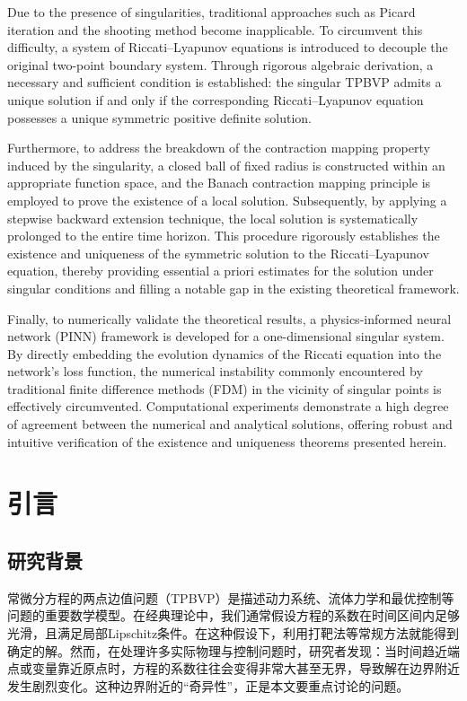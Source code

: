 \documentclass{GZUbachelorthesis}
\begin{document}
\begin{tocabstract}
\begin{enabstract}
  Due to the presence of singularities, traditional approaches such as Picard iteration and the shooting method become inapplicable. To circumvent this difficulty, a system of Riccati–Lyapunov equations is introduced to decouple the original two-point boundary system. Through rigorous algebraic derivation, a necessary and sufficient condition is established: the singular TPBVP admits a unique solution if and only if the corresponding Riccati–Lyapunov equation possesses a unique symmetric positive definite solution.
  
  Furthermore, to address the breakdown of the contraction mapping property induced by the singularity, a closed ball of fixed radius is constructed within an appropriate function space, and the Banach contraction mapping principle is employed to prove the existence of a local solution. Subsequently, by applying a stepwise backward extension technique, the local solution is systematically prolonged to the entire time horizon. This procedure rigorously establishes the existence and uniqueness of the symmetric solution to the Riccati–Lyapunov equation, thereby providing essential a priori estimates for the solution under singular conditions and filling a notable gap in the existing theoretical framework.
  
  Finally, to numerically validate the theoretical results, a physics-informed neural network (PINN) framework is developed for a one-dimensional singular system. By directly embedding the evolution dynamics of the Riccati equation into the network’s loss function, the numerical instability commonly encountered by traditional finite difference methods (FDM) in the vicinity of singular points is effectively circumvented. Computational experiments demonstrate a high degree of agreement between the numerical and analytical solutions, offering robust and intuitive verification of the existence and uniqueness theorems presented herein.
\end{enabstract}
\end{tocabstract}
\section{引言}
\subsection{研究背景}

常微分方程的两点边值问题（TPBVP）是描述动力系统、流体力学和最优控制等问题的重要数学模型。在经典理论中，我们通常假设方程的系数在时间区间内足够光滑，且满足局部Lipschitz条件。在这种假设下，利用打靶法等常规方法就能得到确定的解\cite{keller2018numerical}。然而，在处理许多实际物理与控制问题时，研究者发现：当时间趋近端点或变量靠近原点时，方程的系数往往会变得非常大甚至无界，导致解在边界附近发生剧烈变化\cite{agarwal2003singular}。这种边界附近的“奇异性”，正是本文要重点讨论的问题。
\end{document}
